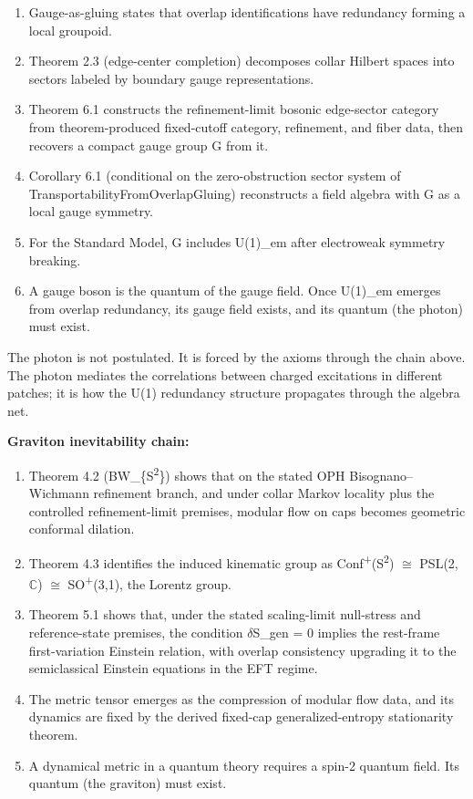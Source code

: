\begin{enumerate}
\def\labelenumi{\arabic{enumi}.}
\tightlist
\item
  Gauge-as-gluing states that overlap identifications have redundancy forming a local groupoid.
\item
  Theorem 2.3 (edge-center completion) decomposes collar Hilbert spaces into sectors labeled by boundary gauge representations.
\item
  Theorem 6.1 constructs the refinement-limit bosonic edge-sector category from theorem-produced fixed-cutoff category, refinement, and fiber data, then recovers a compact gauge group G from it.
\item
  Corollary 6.1 (conditional on the zero-obstruction sector system of TransportabilityFromOverlapGluing) reconstructs a field algebra with G as a local gauge symmetry.
\item
  For the Standard Model, G includes U(1)\_em after electroweak symmetry breaking.
\item
  A gauge boson is the quantum of the gauge field. Once U(1)\_em emerges from overlap redundancy, its gauge field exists, and its quantum (the photon) must exist.
\end{enumerate}

The photon is not postulated. It is forced by the axioms through the chain above. The photon mediates the correlations between charged excitations in different patches; it is how the U(1) redundancy structure propagates through the algebra net.

\textbf{Graviton inevitability chain:}

\begin{enumerate}
\def\labelenumi{\arabic{enumi}.}
\tightlist
\item
  Theorem 4.2 (BW\_\{S\textsuperscript{2}\}) shows that on the stated OPH Bisognano--Wichmann refinement branch, and under collar Markov locality plus the controlled refinement-limit premises, modular flow on caps becomes geometric conformal dilation.
\item
  Theorem 4.3 identifies the induced kinematic group as Conf\textsuperscript{+}(S\textsuperscript{2}) \ensuremath{\cong} PSL(2,\ensuremath{\mathbb{C}}) \ensuremath{\cong} SO\textsuperscript{+}(3,1), the Lorentz group.
\item
  Theorem 5.1 shows that, under the stated scaling-limit null-stress and reference-state premises, the condition \ensuremath{\delta}S\_gen = 0 implies the rest-frame first-variation Einstein relation, with overlap consistency upgrading it to the semiclassical Einstein equations in the EFT regime.
\item
  The metric tensor emerges as the compression of modular flow data, and its dynamics are fixed by the derived fixed-cap generalized-entropy stationarity theorem.
\item
  A dynamical metric in a quantum theory requires a spin-2 quantum field. Its quantum (the graviton) must exist.
\end{enumerate}

